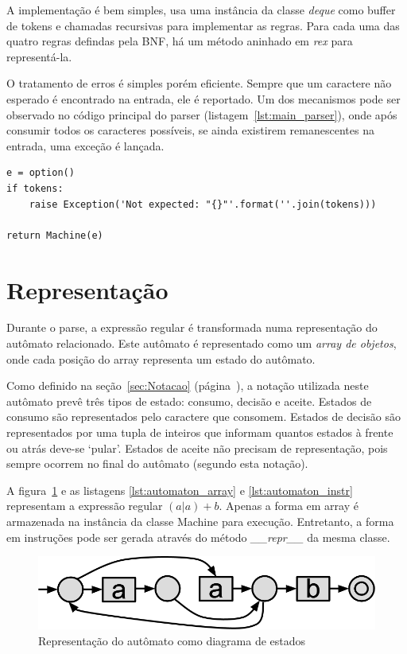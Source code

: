 \documentclass[a4paper,12pt,oneside,onecolumn]{uerj}
\begin{document}
A implementação é bem simples, usa uma instância da classe \emph{deque} como buffer de tokens e chamadas recursivas para implementar as regras. Para cada uma das quatro regras defindas pela BNF, há um método aninhado em \emph{rex} para representá-la.

O tratamento de erros é simples porém eficiente. Sempre que um caractere não esperado é encontrado na entrada, ele é reportado. Um dos mecanismos pode ser observado no código principal do parser (listagem~\ref{lst:main_parser}), onde após consumir todos os caracteres possíveis, se ainda existirem remanescentes na entrada, uma exceção é lançada.

\vspace{0.5cm}
\begin{lstlisting}[caption={Exemplo de tratamento de erros no parser},label=lst:main_parser]
e = option()
if tokens: 
    raise Exception('Not expected: "{}"'.format(''.join(tokens)))

return Machine(e)
\end{lstlisting}

\section{Representação}

Durante o parse, a expressão regular é transformada numa representação do autômato relacionado. Este autômato é representado como um \emph{array de objetos}, onde cada posição do array representa um estado do autômato.

Como definido na seção~\ref{sec:Notacao} (página~\pageref{sec:Notacao}), a notação utilizada neste autômato prevê três tipos de estado: consumo, decisão e aceite. Estados de consumo são representados pelo caractere que consomem. Estados de decisão são representados por uma tupla de inteiros que informam quantos estados à frente ou atrás deve-se `pular'. Estados de aceite não precisam de representação, pois sempre ocorrem no final do autômato (segundo esta notação).

A figura~\ref{fig:exemplo_automato_puro} e as listagens \ref{lst:automaton_array} e \ref{lst:automaton_instr} representam a expressão regular $(a|a)+b$. Apenas a forma em array é armazenada na instância da classe Machine para execução. Entretanto, a forma em instruções pode ser gerada através do método \emph{\_\_repr\_\_} da mesma classe.

\begin{figure}[!htbp]
  \centering
  \includegraphics[scale=0.4]{figures/exemplo_automato_puro.png}
  \caption{Representação do autômato como diagrama de estados}
  \label{fig:exemplo_automato_puro}
\end{figure}
\end{document}
